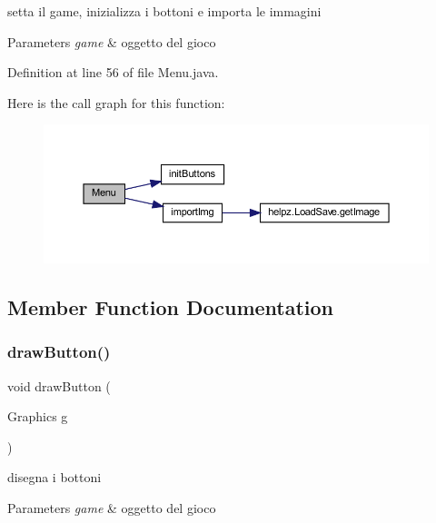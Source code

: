 setta il game, inizializza i bottoni e importa le immagini 


\begin{DoxyParams}{Parameters}
{\em game} & oggetto del gioco \\
\hline
\end{DoxyParams}


Definition at line 56 of file Menu.\+java.

Here is the call graph for this function\+:
\nopagebreak
\begin{figure}[H]
\begin{center}
\leavevmode
\includegraphics[width=350pt]{classscenes_1_1_menu_aa568425829ee847c6c97c418516a3c81_cgraph}
\end{center}
\end{figure}


\subsection{Member Function Documentation}
\mbox{\label{classscenes_1_1_menu_a65768678909bc0512c6cb9780709ad38}} 
\subsubsection{\texorpdfstring{draw\+Button()}{drawButton()}}
{\footnotesize\ttfamily void draw\+Button (\begin{DoxyParamCaption}\item[{Graphics}]{g }\end{DoxyParamCaption})\hspace{0.3cm}{\ttfamily [private]}}



disegna i bottoni 


\begin{DoxyParams}{Parameters}
{\em game} & oggetto del gioco \\
\hline
\end{DoxyParams}


